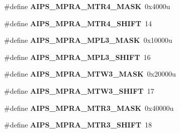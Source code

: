 \begin{DoxyCompactItemize}
\item 
\hypertarget{group___a_i_p_s___register___masks_gaca05c01df65e4d0f524e055eac1bd18d}{}\#define {\bfseries A\+I\+P\+S\+\_\+\+M\+P\+R\+A\+\_\+\+M\+T\+R4\+\_\+\+M\+A\+S\+K}~0x4000u\label{group___a_i_p_s___register___masks_gaca05c01df65e4d0f524e055eac1bd18d}

\item 
\hypertarget{group___a_i_p_s___register___masks_ga68f2fafe4cdcabb30910ef88b0435935}{}\#define {\bfseries A\+I\+P\+S\+\_\+\+M\+P\+R\+A\+\_\+\+M\+T\+R4\+\_\+\+S\+H\+I\+F\+T}~14\label{group___a_i_p_s___register___masks_ga68f2fafe4cdcabb30910ef88b0435935}

\item 
\hypertarget{group___a_i_p_s___register___masks_ga4d087bd54013cebe84f39e2a7ce805f6}{}\#define {\bfseries A\+I\+P\+S\+\_\+\+M\+P\+R\+A\+\_\+\+M\+P\+L3\+\_\+\+M\+A\+S\+K}~0x10000u\label{group___a_i_p_s___register___masks_ga4d087bd54013cebe84f39e2a7ce805f6}

\item 
\hypertarget{group___a_i_p_s___register___masks_ga514800328ca5057bc302a655d4b582ed}{}\#define {\bfseries A\+I\+P\+S\+\_\+\+M\+P\+R\+A\+\_\+\+M\+P\+L3\+\_\+\+S\+H\+I\+F\+T}~16\label{group___a_i_p_s___register___masks_ga514800328ca5057bc302a655d4b582ed}

\item 
\hypertarget{group___a_i_p_s___register___masks_ga6e6b3d1dd3a2ad73b12a981e8b19b840}{}\#define {\bfseries A\+I\+P\+S\+\_\+\+M\+P\+R\+A\+\_\+\+M\+T\+W3\+\_\+\+M\+A\+S\+K}~0x20000u\label{group___a_i_p_s___register___masks_ga6e6b3d1dd3a2ad73b12a981e8b19b840}

\item 
\hypertarget{group___a_i_p_s___register___masks_gaa8977d2ad62651772db08080130c288a}{}\#define {\bfseries A\+I\+P\+S\+\_\+\+M\+P\+R\+A\+\_\+\+M\+T\+W3\+\_\+\+S\+H\+I\+F\+T}~17\label{group___a_i_p_s___register___masks_gaa8977d2ad62651772db08080130c288a}

\item 
\hypertarget{group___a_i_p_s___register___masks_ga373ba49149f837bf7a4e6fc4919edf5c}{}\#define {\bfseries A\+I\+P\+S\+\_\+\+M\+P\+R\+A\+\_\+\+M\+T\+R3\+\_\+\+M\+A\+S\+K}~0x40000u\label{group___a_i_p_s___register___masks_ga373ba49149f837bf7a4e6fc4919edf5c}

\item 
\hypertarget{group___a_i_p_s___register___masks_ga5c05eee95b3f5fd8cc95ee16d2963a77}{}\#define {\bfseries A\+I\+P\+S\+\_\+\+M\+P\+R\+A\+\_\+\+M\+T\+R3\+\_\+\+S\+H\+I\+F\+T}~18\label{group___a_i_p_s___register___masks_ga5c05eee95b3f5fd8cc95ee16d2963a77}


\end{DoxyCompactItemize}
